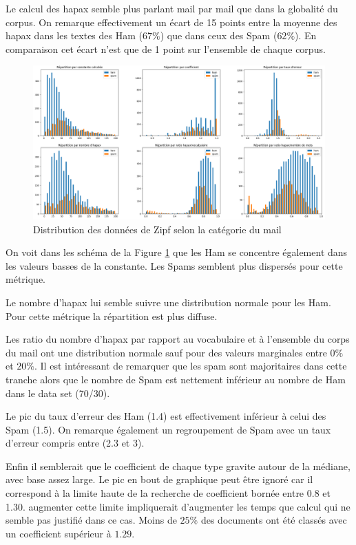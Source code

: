 \documentclass[a4paper,12pt]{article}
\begin{document}
				Le calcul des hapax semble plus parlant mail par mail que dans la globalité du corpus. On remarque effectivement un écart de 15 points entre la moyenne des hapax dans les textes des Ham ($67\%$) que dans ceux des Spam ($62\%$). En comparaison cet écart n'est que de 1 point sur l'ensemble de chaque corpus.
				
				\begin{figure}[H]
					\includegraphics[width=\linewidth]{img/p2zipf.png}
					\caption{Distribution des données de Zipf selon la catégorie du mail}
					\label{fig:p2zpif}
				\end{figure}	
				
				On voit dans les schéma de la Figure \ref{fig:p2zpif} que les Ham se concentre également dans les valeurs basses de la constante. Les Spams semblent plus dispersés pour cette métrique.
				
				Le nombre d'hapax lui semble suivre une distribution normale pour les Ham. Pour cette métrique la répartition est plus diffuse. 

				Les ratio du nombre d'hapax par rapport au vocabulaire et à l'ensemble du corps du mail ont une distribution normale sauf pour des valeurs marginales entre $0\%$ et $20\%$. Il est intéressant de remarquer que les spam sont majoritaires dans cette tranche alors que le nombre de Spam est nettement inférieur au nombre de Ham dans le data set	(70/30).		
				
				Le pic du taux d'erreur des Ham (1.4) est effectivement inférieur à celui des Spam (1.5). On remarque également un regroupement de Spam avec un taux d'erreur compris entre (2.3 et 3).
				
				Enfin il semblerait que le coefficient de chaque type gravite autour de la médiane, avec base assez large. Le pic en bout de graphique peut être ignoré car il correspond à la limite haute de la recherche de coefficient bornée entre 0.8 et 1.30. augmenter cette limite impliquerait d'augmenter les temps que calcul qui ne semble pas justifié dans ce cas. Moins de $25\%$ des documents ont été classés avec un coefficient supérieur à $1.29$.
				
\end{document}
